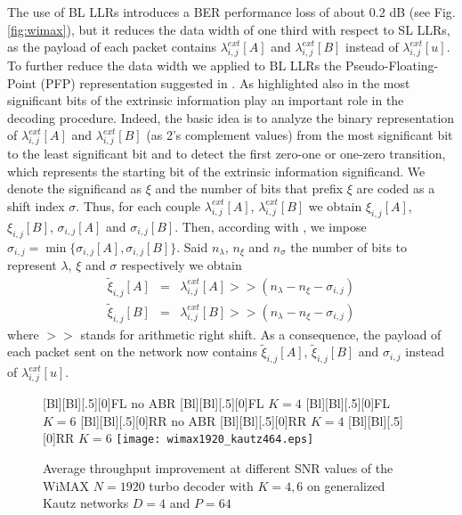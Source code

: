 \documentclass[10pt,twocolumn,journal]{IEEEtran}
\begin{document}
The use of BL LLRs introduces a BER performance loss of about 0.2 dB (see Fig. \ref{fig:wimax}), 
but it reduces the data width of one third with respect to SL LLRs,
as the payload of each packet contains $\lambda^{ext}_{i,j}[A]$ and $\lambda^{ext}_{i,j}[B]$ 
instead of $\lambda^{ext}_{i,j}[u]$. 
To further reduce the data width we applied to BL LLRs the Pseudo-Floating-Point (PFP) representation suggested 
in \cite{lee_VTC08}.
As highlighted also in \cite{vogt_EL00,masera_ISTC08} the most significant bits of the extrinsic information 
play an important role in the decoding procedure. 
Indeed, the basic idea is to analyze the binary representation of $\lambda^{ext}_{i,j}[A]$ and $\lambda^{ext}_{i,j}[B]$ 
(as 2's complement values) from the most significant bit to the least significant bit and to detect the first 
zero-one or one-zero transition, which represents the starting bit of the extrinsic information significand. 
We denote the significand as $\xi$ and the number of bits that prefix $\xi$ are coded as a shift index $\sigma$. 
Thus, for each couple $\lambda^{ext}_{i,j}[A]$, $\lambda^{ext}_{i,j}[B]$ we obtain $\xi_{i,j}[A]$, $\xi_{i,j}[B]$, 
$\sigma_{i,j}[A]$ and $\sigma_{i,j}[B]$. 
Then, according with \cite{lee_VTC08}, we impose $\sigma_{i,j}=\min\{\sigma_{i,j}[A], \sigma_{i,j}[B]\}$. 
Said $n_{\lambda}$, $n_{\xi}$ and $n_{\sigma}$ the number of bits to represent $\lambda$, $\xi$ and $\sigma$ 
respectively we obtain 
\begin{eqnarray}
\tilde{\xi}_{i,j}[A] & = & \lambda^{ext}_{i,j}[A] >> (n_{\lambda} - n_{\xi} - \sigma_{i,j}) \\
\tilde{\xi}_{i,j}[B] & = & \lambda^{ext}_{i,j}[B] >> (n_{\lambda} - n_{\xi} - \sigma_{i,j}) 
\end{eqnarray}
where $>>$ stands for arithmetic right shift. As a consequence, the payload of each packet sent on the network 
now contains $\tilde{\xi}_{i,j}[A]$, $\tilde{\xi}_{i,j}[B]$ and $\sigma_{i,j}$ instead of $\lambda^{ext}_{i,j}[u]$.
\begin{figure}[h!]
    \centering
      [Bl][Bl][.5][0]{FL no ABR}
      [Bl][Bl][.5][0]{FL $K=4$}
      [Bl][Bl][.5][0]{FL $K=6$}
      [Bl][Bl][.5][0]{RR no ABR}
      [Bl][Bl][.5][0]{RR $K=4$}
      [Bl][Bl][.5][0]{RR $K=6$}
      \texttt{[image: wimax1920\_kautz464.eps]}
\caption{Average throughput improvement at different SNR values of the WiMAX $N=1920$ turbo decoder with $K=4, 6$ 
on generalized Kautz networks $D=4$ and $P=64$}
\label{fig:ABR_wimax_1920_4}
\end{figure}
\end{document}
